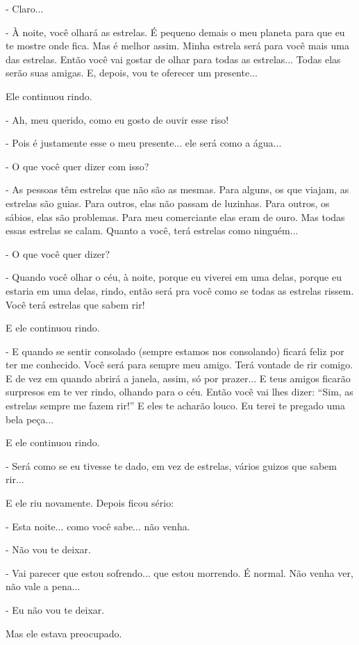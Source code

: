 - Claro...

- À noite, você olhará as estrelas. É pequeno demais o meu planeta para
que eu te mostre onde fica. Mas é melhor assim. Minha estrela será para
você mais uma das estrelas. Então você vai gostar de olhar para todas as
estrelas... Todas elas serão suas amigas. E, depois, vou te oferecer um
presente...

Ele continuou rindo.

- Ah, meu querido, como eu gosto de ouvir esse riso!

- Pois é justamente esse o meu presente... ele será como a água...

- O que você quer dizer com isso?

- As pessoas têm estrelas que não são as mesmas. Para alguns, os que
viajam, as estrelas são guias. Para outros, elas não passam de luzinhas.
Para outros, os sábios, elas são problemas. Para meu comerciante elas
eram de ouro. Mas todas essas estrelas se calam. Quanto a você, terá
estrelas como ninguém...

- O que você quer dizer?

- Quando você olhar o céu, à noite, porque eu viverei em uma delas,
porque eu estaria em uma delas, rindo, então será pra você como se todas
as estrelas rissem. Você terá estrelas que sabem rir!

E ele continuou rindo.

- E quando se sentir consolado (sempre estamos nos consolando) ficará
feliz por ter me conhecido. Você será para sempre meu amigo. Terá
vontade de rir comigo. E de vez em quando abrirá a janela, assim, só por
prazer... E teus amigos ficarão surpresos em te ver rindo, olhando para
o céu. Então você vai lhes dizer: ``Sim, as estrelas sempre me fazem
rir!'' E eles te acharão louco. Eu terei te pregado uma bela peça...

E ele continuou rindo.

- Será como se eu tivesse te dado, em vez de estrelas, vários guizos que
sabem rir...

E ele riu novamente. Depois ficou sério:

- Esta noite... como você sabe... não venha.

- Não vou te deixar.

- Vai parecer que estou sofrendo... que estou morrendo. É normal. Não
venha ver, não vale a pena...

- Eu não vou te deixar.

Mas ele estava preocupado.

